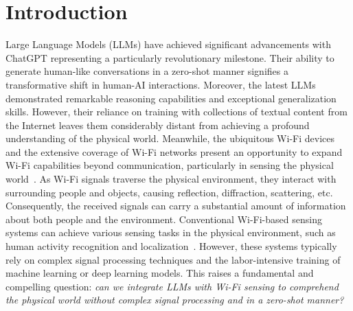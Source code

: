\section{Introduction}
\vspace{-3mm}


Large Language Models (LLMs) have achieved significant advancements with ChatGPT representing a particularly revolutionary milestone. Their ability to generate human-like conversations in a zero-shot manner signifies a transformative shift in human-AI interactions. Moreover, the latest LLMs demonstrated remarkable reasoning capabilities and exceptional generalization skills. However, their reliance on training with collections of textual content from the Internet leaves them considerably distant from achieving a profound understanding of the physical world. Meanwhile, the ubiquitous Wi-Fi devices and the extensive coverage of Wi-Fi networks present an opportunity to expand Wi-Fi capabilities beyond communication, particularly in sensing the physical world~\cite{tan2022commodity}. As Wi-Fi signals traverse the physical environment, they interact with surrounding people and objects, causing reflection, diffraction, scattering, etc. Consequently, the received signals can carry a substantial amount of information about both people and the environment. Conventional Wi-Fi-based sensing systems can achieve various sensing tasks in the physical environment, such as human activity recognition and localization~\cite{ma2019wifi}. However, these systems typically rely on complex signal processing techniques and the labor-intensive training of machine learning or deep learning models.
This raises a fundamental and compelling question: \emph{can we integrate LLMs with Wi-Fi sensing to comprehend the physical world without complex signal processing and in a zero-shot manner?}

